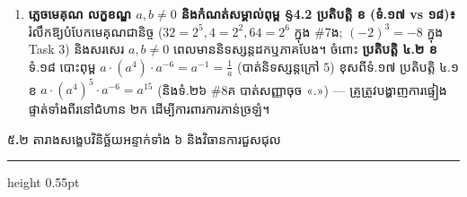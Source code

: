 \documentclass[a4paper,12pt]{article}
\newcommand{\en}[1]{{\TimesEn #1}}
\newcommand{\enbf}[1]{{\TimesEn\textbf{#1}}}
\newcommand{\subsectitle}[1]{{\muol\fontsize{11.5pt}{18.5pt}\selectfont #1}}
\newcommand{\subsec}[1]{%
  \Needspace{1.7cm}%
  \vspace{3pt}%
  \subsectitle{#1}\par%
  \vspace{-2pt}%
  {\color{black}\hrule height 0.55pt}%
  \vspace{3pt}%
}
\begin{document}
\begin{enumerate}[leftmargin=0.65cm]
  \item \textbf{ភ្លេចមេគុណ លក្ខខណ្ឌ $a,b\neq 0$ និងកំណត់សម្គាល់ពុម្ព §4.2 ប្រតិបត្តិ ខ (ទំ.១៧ vs ១៨)៖} រំលឹកឱ្យបំបែកមេគុណជានិច្ច ($32=2^5, 4=2^2, 64=2^6$ ក្នុង \en{\#7}ង; $(-2)^3=-8$ ក្នុង \en{Task 3}) និងសរសេរ $a,b\neq 0$ ពេលមាននិទស្សន្តដកឬភាគបែង។ ចំពោះ \textbf{ប្រតិបត្តិ ៤.២ ខ} ទំ.១៨ បោះពុម្ព $a\cdot(a^4)\cdot a^{-6} = a^{-1} = \frac{1}{a}$ (បាត់និទស្សន្តក្រៅ $5$) ខុសពីទំ.១៧ ប្រតិបត្តិ ៤.១ ខ $a\cdot(a^4)^5\cdot a^{-6} = a^{15}$ (និងទំ.២៦ \en{\#8}គ បាត់សញ្ញាចុច «.») — គ្រូត្រូវបង្ហាញការផ្ទៀងផ្ទាត់ទាំងពីរនៅជំហាន ២ក ដើម្បីការពារការភាន់ច្រឡំ។
\end{enumerate}

\subsec{៥\enbf{.}២ តារាងសង្ខេបវិនិច្ឆ័យអន្ទាក់ទាំង ៦ និងវិធានការជួសជុល}

\begingroup
\linespread{1.0}\fontsize{10.2pt}{15.5pt}\selectfont
\renewcommand{\arraystretch}{1.12}
\end{document}
